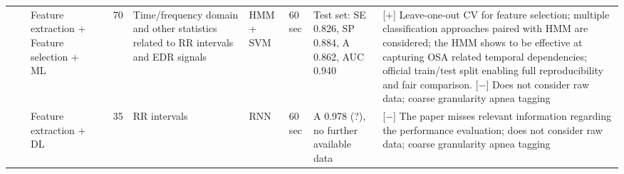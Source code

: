 \documentclass[5p,twocolumn,lefttitle]{elsarticle}
\begin{document}
\begin{table*}[!ht]
{\begin{tabularx}{2\textwidth}{@{}m{2.5em}p{7em}p{10em}lp{2em}p{12em}p{7em}p{3em}p{17em}X@{}}
                            \cmidrule(l){3-10} 
                            &                                                         & Feature extraction + Feature selection + ML                    & \cite{DBLP:journals/tbe/SongLZCX16}      & 70            & Time/frequency domain and other statistics related to RR intervals and EDR signals                                & HMM + SVM                           & 60 sec                                     & Test set: SE 0.826, SP 0.884, A 0.862, AUC 0.940                                                                                                                                        & [+] Leave-one-out CV for feature selection; multiple classification approaches paired with HMM are considered; the HMM shows to be effective at capturing OSA related temporal dependencies; official train/test split enabling full reproducibility and fair comparison. [$-$] Does not consider raw data; coarse granularity apnea tagging                                                                                                         \\
                            \cmidrule(l){3-10} 
                            &                                                         & Feature extraction + DL                                        & \cite{DBLP:conf/cse/ChengSJKL17}         & 35            & RR intervals                                                                                                      & RNN                                 & 60 sec                                     & A 0.978 (?), no further available data                                                                                                                                                & [$-$] The paper misses relevant information regarding the performance evaluation; does not consider raw data; coarse granularity apnea tagging                                                                                                                                                                                                                                                                                                        \\
                            \cmidrule(l){3-10} 

\end{tabularx}}
\end{table*}
\end{document}
